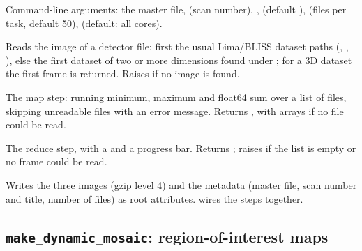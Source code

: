 
Command-line arguments: the master file,  (scan number), ,
 (default ),  (files per task, default 50),
 (default: all cores).

Reads the image of a detector file: first the usual Lima/BLISS dataset paths
(, ,
), else the first dataset of two or more dimensions found under
; for a 3D dataset the first frame is returned. Raises  if no
image is found.

The map step: running minimum, maximum and float64 sum over a list of files, skipping
unreadable files with an error message. Returns , with
 arrays if no file could be read.

The reduce step, with a  and a progress bar. Returns
; raises if the list is empty or no frame could be
read.

Writes the three images (gzip level 4) and the metadata (master file, scan number and title,
number of files) as root attributes.  wires the steps together.

\subsection{\texttt{make\_dynamic\_mosaic}: region-of-interest maps}

